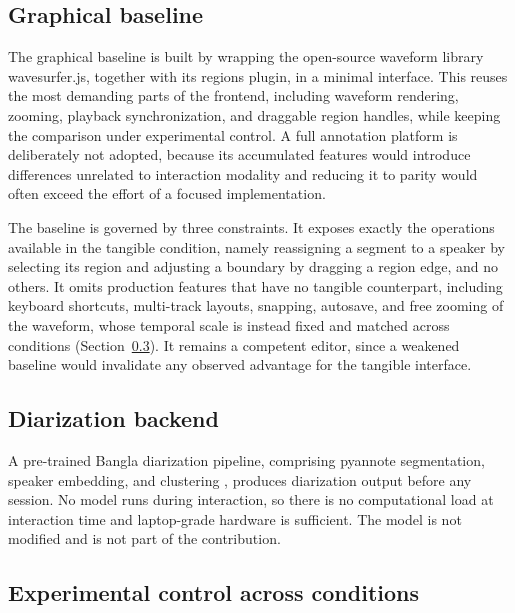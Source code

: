 \documentclass[10pt,a4paper,twocolumn]{article}
\begin{document}
\subsection{Graphical baseline}
\label{sec:method-graphical}

The graphical baseline is built by wrapping the open-source
waveform library wavesurfer.js, together with its regions plugin,
in a minimal interface. This reuses the most demanding parts of
the frontend, including waveform rendering, zooming, playback
synchronization, and draggable region handles,
while keeping the comparison under experimental control. A full
annotation platform is deliberately not adopted, because its
accumulated features would introduce differences unrelated to
interaction modality and reducing it to parity would often exceed
the effort of a focused implementation.

The baseline is governed by three constraints. It exposes exactly
the operations available in the tangible condition, namely
reassigning a segment to a speaker by selecting its region and
adjusting a boundary by dragging a region edge, and no others. It
omits production features that have no tangible counterpart,
including keyboard shortcuts, multi-track layouts, snapping,
autosave, and free zooming of the waveform, whose temporal scale
is instead fixed and matched across conditions
(Section~\ref{sec:method-control}). It remains a competent editor, since a weakened
baseline would invalidate any observed advantage for the tangible
interface.

\subsection{Diarization backend}
\label{sec:method-backend}

A pre-trained Bangla diarization pipeline, comprising pyannote
segmentation, speaker embedding, and clustering
\citep{bredin2020pyannote, plaquet2023powerset}, produces
diarization output before any session. No model runs during
interaction, so there is no computational load at interaction time
and laptop-grade hardware is sufficient. The model is not
modified and is not part of the contribution.

\subsection{Experimental control across conditions}
\label{sec:method-control}
\end{document}
